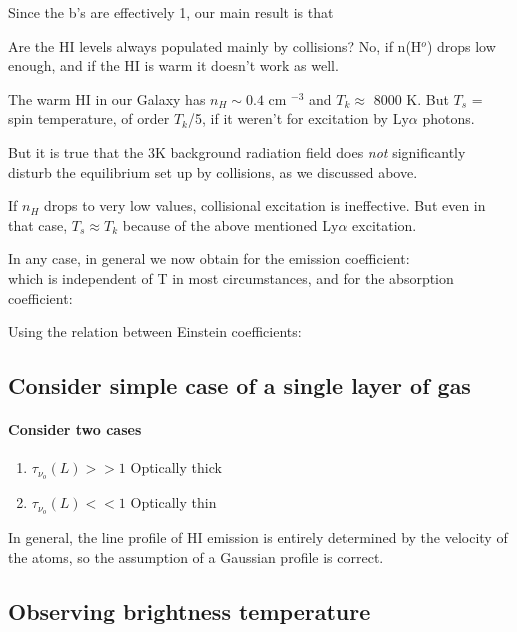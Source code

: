 \documentclass[12pt]{article}
\newcommand{\mar}[1]{\hspace{0pt}\marginpar{-{#1}-}}
\begin{document}
\mar{37}
Since the b's are effectively 1, our \textcolor{bred}{main result}
is that$${
}$$

Are the HI levels always populated mainly by collisions? No, if n(H$^{o}$) drops
low enough, and if the HI is warm it doesn't work as well.

The warm HI in our Galaxy has $n_{H}\sim0.4$ cm $^{-3}$ and $T_{k} \approx$ 8000 K.
But $T_{s}$ = spin temperature, of order $T_{k}$/5, if it weren't for
excitation by Ly$\alpha$ photons.

But it is true that the 3K background radiation field does \emph{not}
significantly disturb the equilibrium set up by collisions, as we
discussed above.

If $n_{H}$ drops to very low values, collisional excitation is ineffective.
But even in that case, $T_{s} \approx T_{k}$ because of the above mentioned
Ly$\alpha$ excitation.

In any case, in general we now obtain for the emission coefficient:
$${
}$$
which is independent of T in most circumstances, and for the absorption
coefficient:
$${
}$$


\mar{38}
Using the relation between Einstein coefficients:

\subsection{Consider simple case of a single layer of gas}

\mar{39}
\paragraph{Consider two cases}
\begin{enumerate}[label={(\roman*)}]
    \item $\tau_{\nu_{o}}(L) >> 1$ Optically thick
    \item $\tau_{\nu_{o}}(L) << 1$ Optically thin
\end{enumerate}
In general, the line profile of HI emission is entirely determined by the velocity
of the atoms, so the assumption of a Gaussian profile is correct.

\mar{40}
\subsection{Observing brightness temperature}


\mar{41}
\end{document}
